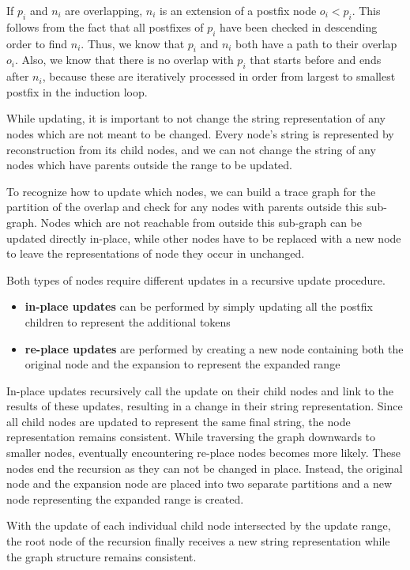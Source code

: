 \noindent
If $p_i$ and $n_i$ are overlapping, $n_i$ is an extension of a postfix node $o_i < p_i$. This follows from the fact that all postfixes of $p_i$ have been checked in descending order to find $n_i$. Thus, we know that $p_i$ and $n_i$ both have a path to their overlap $o_i$. Also, we know that there is no overlap with $p_i$ that starts before and ends after $n_i$, because these are iteratively processed in order from largest to smallest postfix in the induction loop.

\noindent
While updating, it is important to not change the string representation of any nodes which are not meant to be changed. Every node's string is represented by reconstruction from its child nodes, and we can not change the string of any nodes which have parents outside the range to be updated.

\noindent
To recognize how to update which nodes, we can build a trace graph for the partition of the overlap and check for any nodes with parents outside this sub-graph. Nodes which are not reachable from outside this sub-graph can be updated directly in-place, while other nodes have to be replaced with a new node to leave the representations of node they occur in unchanged.\par

\noindent
Both types of nodes require different updates in a recursive update procedure.
\begin{itemize}[noitemsep,topsep=0pt]
        \item \textbf{in-place updates} can be performed by simply updating all the postfix children to represent the additional tokens
        \item \textbf{re-place updates} are performed by creating a new node containing both the original node and the expansion to represent the expanded range
\end{itemize}

\noindent In-place updates recursively call the update on their child nodes and link to the results of these updates, resulting in a change in their string representation. Since all child nodes are updated to represent the same final string, the node representation remains consistent.
While traversing the graph downwards to smaller nodes, eventually encountering re-place nodes becomes more likely. These nodes end the recursion as they can not be changed in place. Instead, the original node and the expansion node are placed into two separate partitions and a new node representing the expanded range is created.

\noindent
With the update of each individual child node intersected by the update range, the root node of the recursion finally receives a new string representation while the graph structure remains consistent.
